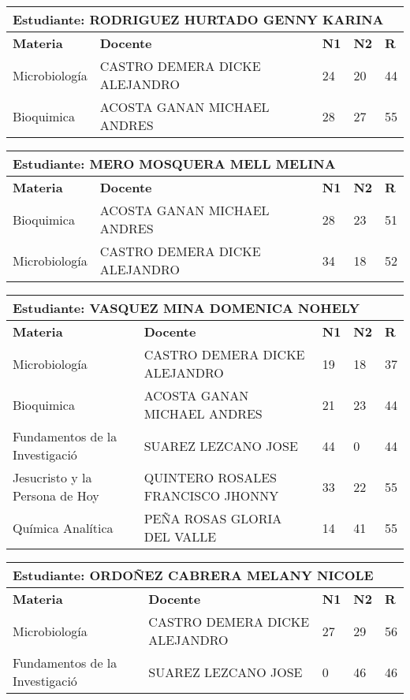 \small
\begin{tabularx}{\textwidth}{|p{5cm}|p{7cm}|X|X|X|}
\hline
\multicolumn{5}{|p{\dimexpr\textwidth-2\tabcolsep-2\arrayrulewidth}|}{\textbf{Estudiante: RODRIGUEZ HURTADO GENNY KARINA }}\\\hline
\textbf{Materia} & \textbf{Docente} & \textbf{N1} & \textbf{N2} & \textbf{R} \\ \hline
Microbiología & CASTRO DEMERA DICKE ALEJANDRO  & 24 & 20& 44 \\ \hline
Bioquimica & ACOSTA GANAN MICHAEL ANDRES  & 28 & 27& 55 \\ \hline
\end{tabularx}\vspace{10mm}
\small
\begin{tabularx}{\textwidth}{|p{5cm}|p{7cm}|X|X|X|}
\hline
\multicolumn{5}{|p{\dimexpr\textwidth-2\tabcolsep-2\arrayrulewidth}|}{\textbf{Estudiante: MERO MOSQUERA MELL MELINA }}\\\hline
\textbf{Materia} & \textbf{Docente} & \textbf{N1} & \textbf{N2} & \textbf{R} \\ \hline
Bioquimica & ACOSTA GANAN MICHAEL ANDRES  & 28 & 23& 51 \\ \hline
Microbiología & CASTRO DEMERA DICKE ALEJANDRO  & 34 & 18& 52 \\ \hline
\end{tabularx}\vspace{10mm}
\small
\begin{tabularx}{\textwidth}{|p{5cm}|p{7cm}|X|X|X|}
\hline
\multicolumn{5}{|p{\dimexpr\textwidth-2\tabcolsep-2\arrayrulewidth}|}{\textbf{Estudiante: VASQUEZ MINA DOMENICA NOHELY }}\\\hline
\textbf{Materia} & \textbf{Docente} & \textbf{N1} & \textbf{N2} & \textbf{R} \\ \hline
Microbiología & CASTRO DEMERA DICKE ALEJANDRO  & 19 & 18& 37 \\ \hline
Bioquimica & ACOSTA GANAN MICHAEL ANDRES  & 21 & 23& 44 \\ \hline
Fundamentos de la Investigació & SUAREZ LEZCANO JOSE   & 44 & 0& 44 \\ \hline
Jesucristo y la Persona de Hoy & QUINTERO ROSALES FRANCISCO JHONNY  & 33 & 22& 55 \\ \hline
Química Analítica & PEÑA ROSAS GLORIA DEL VALLE  & 14 & 41& 55 \\ \hline
\end{tabularx}\vspace{10mm}
\small
\begin{tabularx}{\textwidth}{|p{5cm}|p{7cm}|X|X|X|}
\hline
\multicolumn{5}{|p{\dimexpr\textwidth-2\tabcolsep-2\arrayrulewidth}|}{\textbf{Estudiante: ORDOÑEZ CABRERA MELANY NICOLE }}\\\hline
\textbf{Materia} & \textbf{Docente} & \textbf{N1} & \textbf{N2} & \textbf{R} \\ \hline
Microbiología & CASTRO DEMERA DICKE ALEJANDRO  & 27 & 29& 56 \\ \hline
Fundamentos de la Investigació & SUAREZ LEZCANO JOSE   & 0 & 46& 46 \\ \hline
\end{tabularx}\vspace{10mm}
